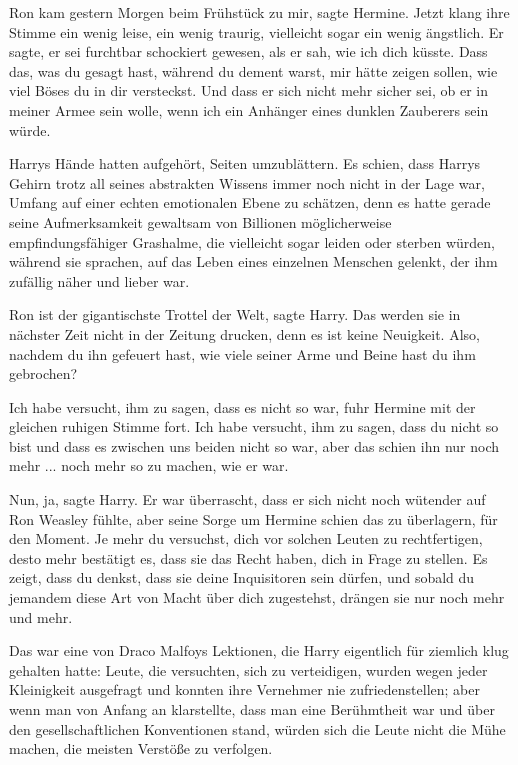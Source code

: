 \glqq{}Ron kam gestern Morgen beim Frühstück zu mir\grqq{}, sagte Hermine. Jetzt
klang ihre Stimme ein wenig leise, ein wenig traurig, vielleicht sogar ein wenig
ängstlich. \glqq{}Er sagte, er sei furchtbar schockiert gewesen, als er sah, wie
ich dich küsste. Dass das, was du gesagt hast, während du dement warst, mir
hätte zeigen sollen, wie viel Böses du in dir versteckst. Und dass er sich nicht
mehr sicher sei, ob er in meiner Armee sein wolle, wenn ich ein Anhänger eines
dunklen Zauberers sein würde.\grqq{}

Harrys Hände hatten aufgehört, Seiten umzublättern. Es schien, dass Harrys
Gehirn trotz all seines abstrakten Wissens immer noch nicht in der Lage war,
Umfang auf einer echten emotionalen Ebene zu schätzen, denn es hatte gerade
seine Aufmerksamkeit gewaltsam von Billionen möglicherweise empfindungsfähiger
Grashalme, die vielleicht sogar leiden oder sterben würden, während sie
sprachen, auf das Leben eines einzelnen Menschen gelenkt, der ihm zufällig näher
und lieber war.

\glqq{}Ron ist der gigantischste Trottel der Welt\grqq{}, sagte Harry. \glqq{}Das
werden sie in nächster Zeit nicht in der Zeitung drucken, denn es ist keine
Neuigkeit. Also, nachdem du ihn gefeuert hast, wie viele seiner Arme und Beine
hast du ihm gebrochen?\grqq{}

\glqq{}Ich habe versucht, ihm zu sagen, dass es nicht so war\grqq{}, fuhr Hermine
mit der gleichen ruhigen Stimme fort. \glqq{}Ich habe versucht, ihm zu sagen,
dass du nicht so bist und dass es zwischen uns beiden nicht so war, aber das
schien ihn nur noch mehr ... noch mehr so zu machen, wie er war.\grqq{}

\glqq{}Nun, ja\grqq{}, sagte Harry. Er war überrascht, dass er sich nicht noch
wütender auf Ron Weasley fühlte, aber seine Sorge um Hermine schien das zu
überlagern, für den Moment. \glqq{}Je mehr du versuchst, dich vor solchen Leuten
zu rechtfertigen, desto mehr bestätigt es, dass sie das Recht haben, dich in
Frage zu stellen. Es zeigt, dass du denkst, dass sie deine Inquisitoren sein
dürfen, und sobald du jemandem diese Art von Macht über dich zugestehst, drängen
sie nur noch mehr und mehr.\grqq{}

Das war eine von Draco Malfoys Lektionen, die Harry eigentlich für ziemlich klug
gehalten hatte: Leute, die versuchten, sich zu verteidigen, wurden wegen jeder
Kleinigkeit ausgefragt und konnten ihre Vernehmer nie zufriedenstellen; aber
wenn man von Anfang an klarstellte, dass man eine Berühmtheit war und über den
gesellschaftlichen Konventionen stand, würden sich die Leute nicht die Mühe
machen, die meisten Verstöße zu verfolgen.

